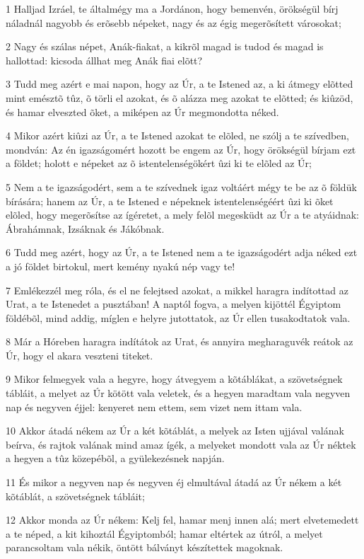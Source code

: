 \par 1 Halljad Izráel, te általmégy ma a Jordánon, hogy bemenvén, örökségül bírj náladnál nagyobb és erõsebb népeket, nagy és az égig megerõsített városokat;
\par 2 Nagy és szálas népet, Anák-fiakat, a kikrõl magad is tudod és magad is hallottad: kicsoda állhat meg Anák fiai elõtt?
\par 3 Tudd meg azért e mai napon, hogy az Úr, a te Istened az, a ki átmegy elõtted mint emésztõ tûz, õ törli el azokat, és õ alázza meg azokat te elõtted; és kiûzöd, és hamar elveszted õket, a miképen az Úr megmondotta néked.
\par 4 Mikor azért kiûzi az Úr, a te Istened azokat te elõled, ne szólj a te szívedben, mondván: Az én igazságomért hozott be engem az Úr, hogy örökségül bírjam ezt a földet; holott e népeket az õ  istentelenségökért ûzi ki te elõled az Úr;
\par 5 Nem a te igazságodért, sem a te szívednek igaz voltáért mégy te be az õ földük bírására; hanem az Úr, a te Istened e népeknek istentelenségéért ûzi ki õket elõled, hogy megerõsítse az ígéretet, a mely felõl megesküdt az Úr a te atyáidnak: Ábrahámnak, Izsáknak és Jákóbnak.
\par 6 Tudd meg azért, hogy az Úr, a te Istened nem a te igazságodért adja néked ezt a jó földet birtokul, mert kemény nyakú nép vagy te!
\par 7 Emlékezzél meg róla, és el ne felejtsed azokat, a mikkel haragra indítottad az Urat, a te Istenedet a pusztában! A naptól fogva, a melyen kijöttél Égyiptom földébõl, mind addig, míglen e helyre jutottatok, az Úr ellen tusakodtatok vala.
\par 8 Már a Hóreben haragra indítátok az Urat, és annyira megharaguvék reátok az Úr, hogy el akara veszteni titeket.
\par 9 Mikor felmegyek vala a hegyre, hogy átvegyem a kõtáblákat, a szövetségnek tábláit, a melyet az Úr kötött vala veletek, és a hegyen maradtam vala negyven nap és negyven éjjel: kenyeret nem ettem, sem vizet nem ittam vala.
\par 10 Akkor átadá nékem az Úr a két kõtáblát, a melyek az Isten ujjával valának beírva, és rajtok valának mind amaz ígék, a melyeket mondott vala az Úr néktek a  hegyen a tûz közepébõl, a gyülekezésnek napján.
\par 11 És mikor a negyven nap és negyven éj elmultával átadá az Úr nékem a két kõtáblát, a szövetségnek tábláit;
\par 12 Akkor monda az Úr nékem: Kelj fel, hamar menj innen alá; mert elvetemedett a te néped, a kit kihoztál Égyiptomból; hamar eltértek az útról, a melyet parancsoltam vala nékik, öntött bálványt készítettek magoknak.
